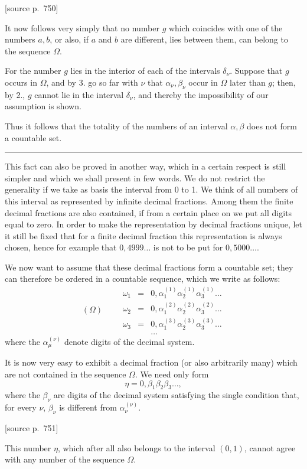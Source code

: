\documentclass[11pt]{article}
\newcommand{\srcpage}[1]{\par\medskip\noindent\textsf{[source p.~#1]}\par\smallskip}
\begin{document}
\srcpage{750}
It now follows very simply that no number $g$ which coincides with one of the numbers $a,b$, or also, if $a$ and $b$ are different, lies between them, can belong to the sequence $\Omega$.

For the number $g$ lies in the interior of each of the intervals $\delta_\nu$. Suppose that $g$ occurs in $\Omega$, and by 3. go so far with $\nu$ that $\alpha_\nu,\beta_\nu$ occur in $\Omega$ later than $g$; then, by 2., $g$ cannot lie in the interval $\delta_\nu$, and thereby the impossibility of our assumption is shown.

Thus it follows that the totality of the numbers of an interval $\alpha,\beta$ does not form a countable set.

\medskip\hrule\medskip

This fact can also be proved in another way, which in a certain respect is still simpler and which we shall present in few words. We do not restrict the generality if we take as basis the interval from 0 to 1. We think of all numbers of this interval as represented by infinite decimal fractions. Among them the finite decimal fractions are also contained, if from a certain place on we put all digits equal to zero. In order to make the representation by decimal fractions unique, let it still be fixed that for a finite decimal fraction this representation is always chosen, hence for example that $0{,}4999\ldots$ is not to be put for $0{,}5000\ldots$.

We now want to assume that these decimal fractions form a countable set; they can therefore be ordered in a countable sequence, which we write as follows:
\[
(\Omega)\qquad
\begin{array}{rcl}
\omega_1&=&0,\alpha_1^{(1)}\alpha_2^{(1)}\alpha_3^{(1)}\ldots\\
\omega_2&=&0,\alpha_1^{(2)}\alpha_2^{(2)}\alpha_3^{(2)}\ldots\\
\omega_3&=&0,\alpha_1^{(3)}\alpha_2^{(3)}\alpha_3^{(3)}\ldots\\
&&\ldots
\end{array}
\]
where the $\alpha_\mu^{(\nu)}$ denote digits of the decimal system.

It is now very easy to exhibit a decimal fraction (or also arbitrarily many) which are not contained in the sequence $\Omega$. We need only form
\[
\eta=0,\beta_1\beta_2\beta_3\ldots,
\]
where the $\beta_\nu$ are digits of the decimal system satisfying the single condition that, for every $\nu$, $\beta_\nu$ is different from $\alpha_\nu^{(\nu)}$.
\srcpage{751}
This number $\eta$, which after all also belongs to the interval $(0,1)$, cannot agree with any number of the sequence $\Omega$.
\end{document}

